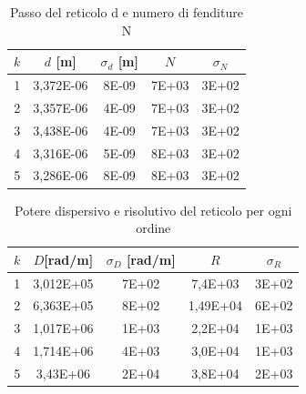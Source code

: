 \documentclass{article}
\begin{document}
        \begin{table}[H]

            \centering

            \begin{tabular}{c c c c c}

                \toprule 
                $k$ & $d$ [m] & $\sigma_d$ [m]  &  $N$  &   $\sigma_N$ \\
                
                \midrule
                1 & 3,372E-06	&	8E-09	&	7E+03   &   3E+02    \\
                2 & 3,357E-06	&	4E-09	&	7E+03   &   3E+02    \\
                3 & 3,438E-06	&	4E-09	&	7E+03   &   3E+02    \\
                4 & 3,316E-06	&	5E-09	&	8E+03   &   3E+02    \\
                5 & 3,286E-06	&	8E-09	&	8E+03   &   3E+02    \\
                \bottomrule
                
            \end{tabular}

            \caption{Passo del reticolo d e numero di fenditure N}
            \label{tabular:passo reticolo e N}

        \end{table}

        \begin{table}[H]

            \centering

            \begin{tabular}{c c c c c }

                \toprule 
                $k$ & $D $[rad/m]  & $\sigma_D$ [rad/m] & $R$ & $\sigma_R$  \\
                \midrule
                1	&	3,012E+05	&	7E+02	&	7,4E+03	    &	3E+02   \\
                2	&	6,363E+05	&	8E+02	&	1,49E+04	&	6E+02   \\
                3	&	1,017E+06	&	1E+03	&	2,2E+04	    &	1E+03   \\
                4	&	1,714E+06	&	4E+03	&	3,0E+04	    &	1E+03   \\
                5	&	3,43E+06	&	2E+04	&	3,8E+04 	&  	2E+03   \\
                \bottomrule
        
            \end{tabular}

            \caption{Potere dispersivo e risolutivo del reticolo per ogni ordine}
            \label{tabular:potere dispersivo e risolutivo}

        \end{table}
\end{document}
